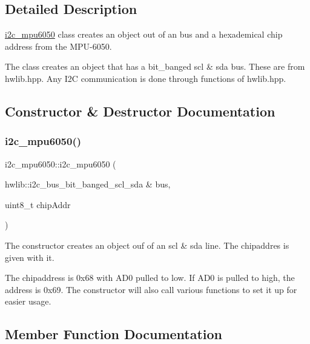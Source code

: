 \subsection{Detailed Description}
\mbox{\hyperlink{classi2c__mpu6050}{i2c\+\_\+mpu6050}} class creates an object out of an bus and a hexademical chip address from the M\+P\+U-\/6050. 

The class creates an object that has a bit\+\_\+banged scl \& sda bus. These are from hwlib.\+hpp. Any I2C communication is done through functions of hwlib.\+hpp. 

\subsection{Constructor \& Destructor Documentation}
\mbox{\label{classi2c__mpu6050_a2cfbc4790fe516a2f3d84c44547afcf0}} 
\subsubsection{\texorpdfstring{i2c\+\_\+mpu6050()}{i2c\_mpu6050()}}
{\footnotesize\ttfamily i2c\+\_\+mpu6050\+::i2c\+\_\+mpu6050 (\begin{DoxyParamCaption}\item[{hwlib\+::i2c\+\_\+bus\+\_\+bit\+\_\+banged\+\_\+scl\+\_\+sda \&}]{bus,  }\item[{uint8\+\_\+t}]{chip\+Addr }\end{DoxyParamCaption})\hspace{0.3cm}{\ttfamily [inline]}}



The constructor creates an object ouf of an scl \& sda line. The chipaddres is given with it. 

The chipaddress is 0x68 with A\+D0 pulled to low. If A\+D0 is pulled to high, the address is 0x69. The constructor will also call various functions to set it up for easier usage. 

\subsection{Member Function Documentation}
\mbox{\label{classi2c__mpu6050_af52506caa980c3103c601640de1dee9a}} 
